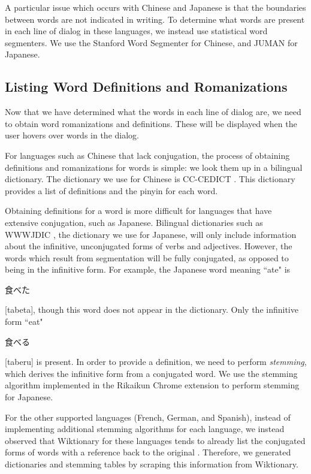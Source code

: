 \documentclass{sigchi}
\begin{document}
A particular issue which occurs with Chinese and Japanese is that the boundaries between
words are not indicated in writing. To determine what words are present
in each line of dialog in these languages, we instead use statistical word segmenters. We use the Stanford Word Segmenter \cite{stanfordsegmenter} for Chinese, and JUMAN \cite{juman} for Japanese.

\subsection{Listing Word Definitions and Romanizations}

Now that we have determined what the words in each line of dialog are, we need
to obtain word romanizations and definitions. These will be displayed when
the user hovers over words in the dialog.

For languages such as Chinese that lack conjugation, the process of obtaining definitions and romanizations for words is simple: we look them up in a bilingual dictionary. The dictionary we use for Chinese is CC-CEDICT \cite{mdbg}. This dictionary provides a list of definitions and the pinyin for each word.

Obtaining definitions for a word is more difficult for languages that have extensive conjugation, such as Japanese. Bilingual dictionaries such as WWWJDIC \cite{wwwjdic}, the dictionary we use for Japanese, will only include information about the infinitive, unconjugated forms of verbs and adjectives. However, the words which result from segmentation will be fully conjugated, as opposed to being in the infinitive form. For example, the Japanese word meaning ``ate" is \begin{CJK}{UTF8}{min}食べた\end{CJK} [tabeta], though this word does not appear in the dictionary. Only the infinitive form ``eat" \begin{CJK}{UTF8}{min}食べる\end{CJK} [taberu] is present. In order to provide a definition, we need to perform \emph{stemming}, which derives the infinitive form from a conjugated word. We use the stemming algorithm implemented in the Rikaikun Chrome extension \cite{rikaikun} to perform stemming for Japanese.

For the other supported languages (French, German, and Spanish), instead of implementing additional stemming algorithms for each language, we instead observed that Wiktionary for these languages tends to already list the conjugated forms of words with a reference back to the original \cite{wiktionary}. Therefore, we generated dictionaries and stemming tables by scraping this information from Wiktionary.
\end{document}
